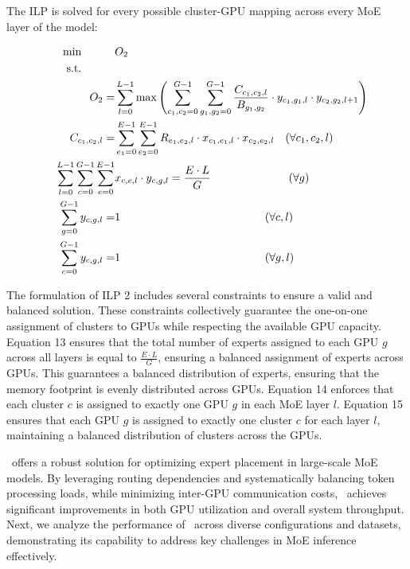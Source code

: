 %
The ILP is solved for every possible cluster-GPU mapping across every MoE layer of the model:
%
\begin{small}
\begin{align}
    \text{min} \quad \quad \quad & O_2 \\
    \text{s.t.} \quad \quad \quad & \notag \\
    O_2 = &\sum_{l=0}^{L-1} \max \left( \sum_{c_1, c_2 = 0}^{G-1} \sum_{g_1, g_2 = 0}^{G-1} \frac{C_{c_1, c_2, l}}{B_{g_1, g_2}} \cdot y_{c_1, g_1, l} \cdot y_{c_2, g_2, l+1} \right) \\
    C_{c_1, c_2, l} = &\sum_{e_1=0}^{E-1} \sum_{e_2=0}^{E-1} R_{e_1, e_2, l} \cdot x_{c_1,e_1,l} \cdot x_{c_2,e_2,l} \quad (\forall c_1, c_2, l) \\
    \quad \sum_{l=0}^{L-1} \sum_{c=0}^{G-1} \sum_{e=0}^{E-1} &x_{c,e,l} \cdot y_{c,g,l} = \frac{E\cdot L}{G} \quad \hspace{6em} (\forall g) \\
    \sum_{g=0}^{G-1} y_{c,g,l} = &1 \quad \hspace{12em} (\forall c, l) \\
    \sum_{c=0}^{G-1} y_{c,g,l} = &1 \quad \hspace{12em} (\forall g, l)
\end{align}
\end{small}


%
The formulation of ILP 2 includes several constraints to ensure a valid and balanced solution. 
These constraints collectively guarantee the one-on-one assignment of clusters to GPUs while respecting the available GPU capacity.
%
Equation 13 ensures that the total number of experts assigned to each GPU \( g \) across all layers is equal to \( \frac{E \cdot L}{G} \), ensuring a balanced assignment of experts across GPUs. This guarantees a balanced distribution of experts, ensuring that the memory footprint is evenly distributed across GPUs.
%
Equation 14 enforces that each cluster \( c \) is assigned to exactly one GPU \( g \) in each MoE layer \( l \).
%
Equation 15 ensures that each GPU \( g \) is assigned to exactly one cluster \( c \) for each layer \( l \), maintaining a balanced distribution of clusters across the GPUs.


 \expertune~offers a robust solution for optimizing expert placement in large-scale MoE models.
%
By leveraging routing dependencies and systematically balancing token processing loads, while minimizing inter-GPU communication costs, \expertune~achieves significant improvements in both GPU utilization and overall system throughput.
%
Next, we analyze the performance of \expertune~across diverse configurations and datasets, demonstrating its capability to address key challenges in MoE inference effectively.

